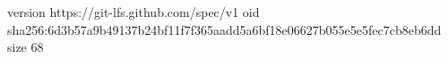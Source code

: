 version https://git-lfs.github.com/spec/v1
oid sha256:6d3b57a9b49137b24bf11f7f365aadd5a6bf18e06627b055e5e5fec7cb8eb6dd
size 68
